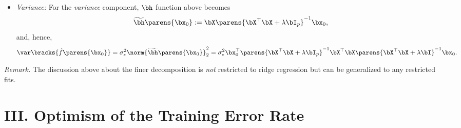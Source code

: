 \documentclass[12pt]{article}
\begin{document}
\begin{enumerate}[label=\textbf{\arabic*.}]
\begin{itemize}
		\item \textit{Variance:} For the \textit{variance} component, $\bh$ function above becomes 
		\begin{align*}
			\widetilde{\bh} \parens{\bx_0} := \bX \parens{\bX^\top \bX + \lambda \bI_p}^{-1} \bx_0, 
		\end{align*}
		and, hence, 
		\begin{align*}
			\var \bracks{\hat{f} \parens{\bx_0}} = \sigma_{\varepsilon}^2 \norm{\widetilde{\bh} \parens{\bx_0}}_2^2 = \sigma_{\varepsilon}^2 \bx_0^\top \parens{\bX^\top \bX + \lambda \bI_p}^{-1} \bX^\top \bX \parens{\bX^\top \bX + \lambda \bI}^{-1} \bx_0. 
		\end{align*}
	\end{itemize}
	
	\textit{Remark.} The discussion above about the finer decomposition is \emph{not} restricted to ridge regression but can be generalized to any restricted fits. 
	
\end{enumerate}


\section*{III. Optimism of the Training Error Rate} 
\end{document}
